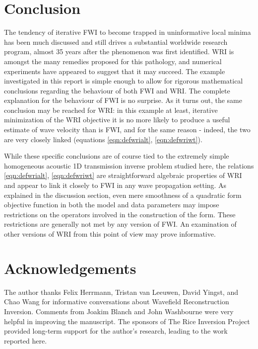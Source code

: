 \section{Conclusion}
The tendency of iterative FWI to become trapped in uninformative local
minima has been much discussed and still drives a substantial
worldwide research program, almost 35 years after the phenomenon was
first identified. WRI is amongst the many remedies proposed for this
pathology, and numerical experiments have appeared to suggest that it
may succeed. The example investigated in this report is simple enough
to allow for rigorous mathematical conclusions regarding the behaviour
of both FWI and WRI. The complete explanation for the behaviour of FWI
is no surprise. As it turns out, the same conclusion may be reached
for WRI: in this example at least, iterative minimization of the WRI
objective it is no more likely to produce a useful estimate of wave
velocity than is FWI, and for the same reason - indeed, the two are
very closely linked (equations \ref{eqn:defwrialt},
\ref{eqn:defwriwt}).

While these specific conclusions are of course tied to the extremely
simple homogeneous acoustic 1D transmission inverse problem studied
here, the relations \ref{eqn:defwrialt}, \ref{eqn:defwriwt} are
straightforward algebraic properties of WRI and appear to link it
closely to FWI in any wave propagation setting. As explained in the
discussion section, even mere smoothness of a quadratic form objective
function in both the model and data parameters may impose restrictions
on the operators involved in the construction of the form. These
restrictions are generally not met by any version of FWI. An
examination of other versions of WRI from this point of view may prove
informative.

\section{Acknowledgements}
The author thanks Felix Herrmann, Tristan van Leeuwen, David Yingst,
and Chao Wang for informative conversations about Wavefield
Reconstruction Inversion. Comments from Joakim Blanch and John
Washbourne were very helpful in improving the manuscript. The sponsors
of The Rice Inversion Project provided long-term support for the
author's research, leading to the work reported here.




